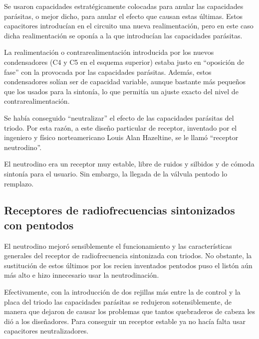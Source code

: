 \documentclass[letterpaper,11pt,spanish]{sphinxmanual}
\let\sphinxpxdimen\pdfpxdimen\else\newdimen\sphinxpxdimen
\begin{document}
Se usaron capacidades estratégicamente colocadas para anular las capacidades parásitas, o mejor dicho, para anular el efecto que causan estas últimas. Estos capacitores introducían en el circuito una nueva realimentación, pero en este caso dicha realimentación se oponía a la que introducían las capacidades parásitas.

\sphinxincludegraphics[width=588\sphinxpxdimen,height=226\sphinxpxdimen]{{receprfs3low}.png}

La realimentación o contra\sphinxhyphen{}realimentación introducida por los nuevos condensadores (C4 y C5 en el esquema superior) estaba justo en “oposición de fase” con la provocada por las capacidades parásitas. Además, estos condensadores solían ser de capacidad variable, aunque bastante más pequeños que los usados para la sintonía, lo que permitía un ajuste exacto del nivel de contra\sphinxhyphen{}realimentación.

Se había conseguido “neutralizar” el efecto de las capacidades parásitas del triodo. Por esta razón, a este diseño particular de receptor, inventado por el ingeniero y físico norteamericano Louis Alan Hazeltine, se le llamó “receptor neutrodino”.

El neutrodino era un receptor muy estable, libre de ruidos y silbidos y de cómoda sintonía para el usuario. Sin embargo, la llegada de la válvula pentodo lo remplazo.


\subsection{Receptores de radiofrecuencias sintonizados con pentodos}
\label{\detokenize{introduccion/sistemas:Receptores-de-radiofrecuencias-sintonizados-con-pentodos}}
El neutrodino mejoró sensiblemente el funcionamiento y las características generales del receptor de radiofrecuencia sintonizada con triodos. No obstante, la sustitución de estos últimos por los recien inventados pentodos puso el listón aún más alto e hizo innecesario usar la neutrodinación.

Efectivamente, con la introducción de dos rejillas más entre la de control y la placa del triodo las capacidades parásitas se redujeron sotensiblemente, de manera que dejaron de causar los problemas que tantos quebraderos de cabeza les dió a los diseñadores. Para conseguir un receptor estable ya no hacía falta usar capacitores neutralizadores.

\sphinxincludegraphics[width=588\sphinxpxdimen,height=226\sphinxpxdimen]{{receprfs4low}.png}
\end{document}
